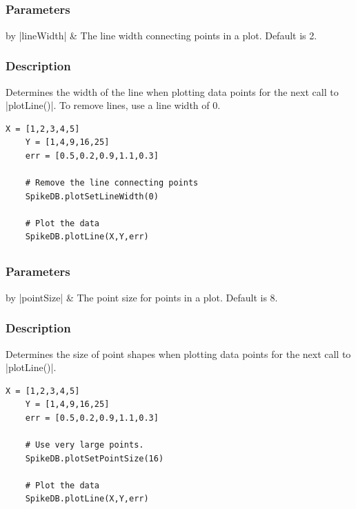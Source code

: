 \documentclass{report}
\begin{document}
\clearpage
\subsection{}
\subsubsection{Parameters}
\begin{table}[h]
\begin{center}
\begin{tabular}{by}
		|lineWidth| & The line width connecting points in a plot. Default is 2.\\ 
	\end{tabular}
\end{center}
\end{table}
\subsubsection{Description}
Determines the width of the line when plotting data points for the next call to |plotLine()|. To remove lines, use a line width of 0.
\begin{lstlisting}[caption=Example]
	X = [1,2,3,4,5]
	Y = [1,4,9,16,25]
	err = [0.5,0.2,0.9,1.1,0.3]

	# Remove the line connecting points
	SpikeDB.plotSetLineWidth(0)

	# Plot the data
	SpikeDB.plotLine(X,Y,err)
\end{lstlisting}


\clearpage
\subsection{}
\subsubsection{Parameters}
\begin{table}[h]
\begin{center}
\begin{tabular}{by}
		|pointSize| & The point size for points in a plot. Default is 8.\\ 
	\end{tabular}
\end{center}
\end{table}
\subsubsection{Description}
Determines the size of point shapes when plotting data points for the next call to |plotLine()|. 
\begin{lstlisting}[caption=Example]
	X = [1,2,3,4,5]
	Y = [1,4,9,16,25]
	err = [0.5,0.2,0.9,1.1,0.3]

	# Use very large points.
	SpikeDB.plotSetPointSize(16)

	# Plot the data
	SpikeDB.plotLine(X,Y,err)
\end{lstlisting}
\end{document}
